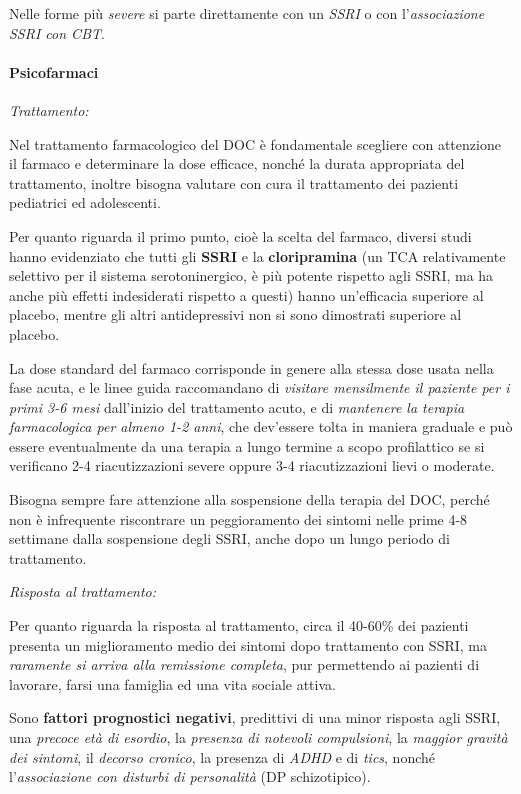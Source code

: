 Nelle forme più \emph{severe} si parte direttamente con un \emph{SSRI} o
con l'\emph{associazione SSRI con CBT}.

\paragraph{Psicofarmaci}

\emph{\emph{Trattamento:}}

Nel trattamento farmacologico del DOC è fondamentale scegliere con
attenzione il farmaco e determinare la dose efficace, nonché la durata
appropriata del trattamento, inoltre bisogna valutare con cura il
trattamento dei pazienti pediatrici ed adolescenti.

Per quanto riguarda il primo punto, cioè la scelta del farmaco, diversi
studi hanno evidenziato che tutti gli \textbf{SSRI} e la
\textbf{cloripramina} (un TCA relativamente selettivo per il sistema
serotoninergico, è più potente rispetto agli SSRI, ma ha anche più
effetti indesiderati rispetto a questi) hanno un'efficacia superiore al
placebo, mentre gli altri antidepressivi non si sono dimostrati
superiore al placebo.

La dose standard del farmaco corrisponde in genere alla stessa dose
usata nella fase acuta, e le linee guida raccomandano di \emph{visitare
mensilmente il paziente per i primi 3-6 mesi} dall'inizio del
trattamento acuto, e di \emph{mantenere la terapia farmacologica per
almeno 1-2 anni}, che dev'essere tolta in maniera graduale e può essere
eventualmente da una terapia a lungo termine a scopo profilattico se si
verificano 2-4 riacutizzazioni severe oppure 3-4 riacutizzazioni lievi o
moderate.

Bisogna sempre fare attenzione alla sospensione della terapia del DOC,
perché non è infrequente riscontrare un peggioramento dei sintomi nelle
prime 4-8 settimane dalla sospensione degli SSRI, anche dopo un lungo
periodo di trattamento.

\emph{\emph{Risposta al trattamento:}}

Per quanto riguarda la risposta al trattamento, circa il 40-60\% dei
pazienti presenta un miglioramento medio dei sintomi dopo trattamento
con SSRI, ma \emph{raramente si arriva alla remissione completa}, pur
permettendo ai pazienti di lavorare, farsi una famiglia ed una vita
sociale attiva.

Sono \textbf{fattori prognostici negativi}, predittivi di una minor
risposta agli SSRI, una \emph{precoce età di esordio}, la \emph{presenza
di notevoli compulsioni}, la \emph{maggior gravità dei sintomi}, il
\emph{decorso cronico}, la presenza di \emph{ADHD} e di \emph{tics},
nonché l'\emph{associazione con disturbi di personalità} (DP
schizotipico).


